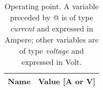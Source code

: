 \begin{table}[h]
  \centering
  \begin{tabular}{|l|r|}
    \hline    
    {\bf Name} & {\bf Value [A or V]} \\ \hline
    
  \end{tabular}
  \caption{Operating point. A variable preceded by @ is of type {\em current}
    and expressed in Ampere; other variables are of type {\it voltage} and expressed in
    Volt.}
  \label{tab:op3}
\end{table}





